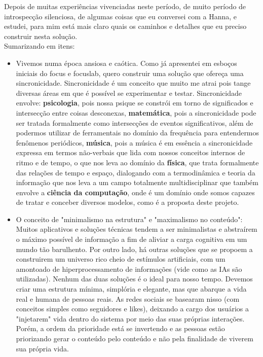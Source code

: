 \documentclass[11pt]{article}
\begin{document}
Depois de muitas experiências vivenciadas neste período, de muito período de introspecção silenciosa, de algumas coisas que eu conversei com a Hanna, e estudei, para mim está mais claro quais os caminhos e detalhes que eu preciso construir nesta solução.\\

Sumarizando em itens:

\begin{itemize}
\item Vivemos numa época ansiosa e caótica. Como já apresentei em esboços iniciais do focus e focuslab, quero construir uma solução que ofereça uma sincronicidade. Sincronicidade é um conceito que muito me atrai pois tange diversas áreas em que é possível se experimentar e testar. Sincronicidade envolve: \textbf{psicologia}, pois nossa psique se constrói em torno de significados e intersecção entre coisas desconexas, \textbf{matemática}, pois a sincronicidade pode ser tratada formalmente como intersecções de eventos significativos, além de podermos utilizar de ferramentais no domínio da frequência para entendermos fenômenos periódicos, \textbf{música}, pois a música é em essência a sincronicidade expressa em termos não-verbais que lida com nossos conceitos internos de ritmo e de tempo, o que nos leva ao domínio da \textbf{física}, que trata formalmente das relações de tempo e espaço, dialogando com a termodinâmica e teoria da informação que nos leva a um campo totalmente multidisciplinar que também envolve a \textbf{ciência da computação}, onde é um domínio onde somos capazes de tratar e conceber diversos modelos, como é a proposta deste projeto.

\item O conceito de "minimalismo na estrutura" e "maximalismo no conteúdo": Muitos aplicativos e soluções técnicas tendem a ser minimalistas e abstraírem o máximo possível de informação a fim de aliviar a carga cognitiva em um mundo tão barulhento. Por outro lado, há outras soluções que se propoem a construirem um universo rico cheio de estímulos artificiais, com um amontoado de hiperprocessamento de informações (vide como as IAs são utilizadas). Nenhum das duas soluções é o ideal para nosso tempo. Devemos criar uma estrutura mínima, simplória e elegante, mas que abarque a vida real e humana de pessoas reais. As redes sociais se basearam nisso (com conceitos simples como seguidores e likes), deixando a cargo dos usuários a "injetarem" vida dentro do sistema por meio das suas próprias interações. Porém, a ordem da prioridade está se invertendo e as pessoas estão priorizando gerar o conteúdo pelo conteúdo e não pela finalidade de viverem sua própria vida.


\end{itemize}
\end{document}
